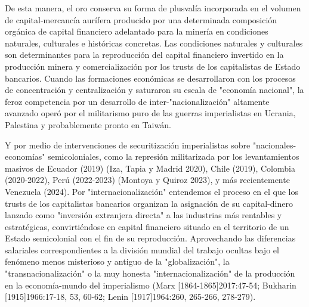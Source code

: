 \documentclass[]{interact}
\theoremstyle{plain}%
\theoremstyle{definition}
\theoremstyle{remark}
\begin{document}
De esta manera, el oro conserva su forma de plusvalía incorporada en el volumen de capital-mercancía aurífera producido por una determinada composición orgánica de capital financiero adelantado para la minería en condiciones naturales, culturales e históricas concretas. Las condiciones naturales y culturales son determinantes para la reproducción del capital financiero invertido en la producción minera y comercialización por los trusts de los capitalistas de Estado bancarios. Cuando las formaciones económicas se desarrollaron con los procesos de concentración y centralización y saturaron su escala de "economía nacional", la feroz competencia por un desarrollo de inter-"nacionalización" altamente avanzado operó por el militarismo puro de las guerras imperialistas en Ucrania, Palestina y probablemente pronto en Taiwán. 

Y por medio de intervenciones de securitización imperialistas sobre "nacionales-economías" semicoloniales, como la represión militarizada por los levantamientos masivos de Ecuador (2019) (Iza, Tapia y Madrid 2020), Chile (2019), Colombia (2020-2022), Perú (2022-2023) (Montoya y Quiroz 2023), y más recientemente Venezuela (2024). Por "internacionalización" entendemos el proceso en el que los trusts de los capitalistas bancarios organizan la asignación de su capital-dinero lanzado como "inversión extranjera directa" a las industrias más rentables y estratégicas, convirtiéndose en capital financiero situado en el territorio de un Estado semicolonial con el fin de su reproducción. Aprovechando las diferencias salariales correspondientes a la división mundial del trabajo ocultas bajo el fenómeno menos misterioso y antiguo de la "globalización", la "transnacionalización" o la muy honesta "internacionalización" de la producción en la economía-mundo del imperialismo (Marx [1864-1865]2017:47-54; Bukharin [1915]1966:17-18, 53, 60-62; Lenin [1917]1964:260, 265-266, 278-279). 
\end{document}
